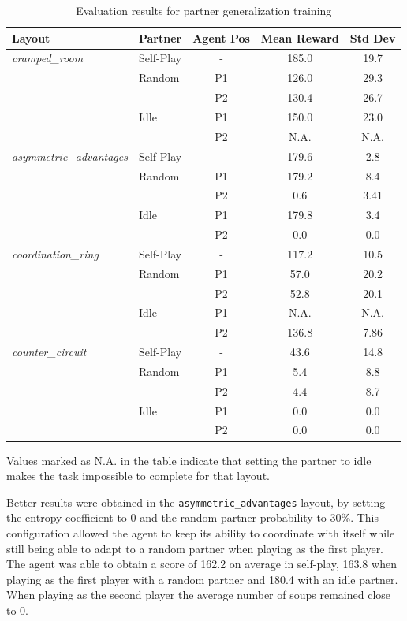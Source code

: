 \documentclass{article}
\begin{document}
\begin{table}[ht]
\centering
\caption{Evaluation results for partner generalization training}
\label{tab:partner_generalization_results}
\begin{tabular}{llccc}
\toprule
Layout & Partner & Agent Pos & Mean Reward & Std Dev \\
\midrule
\textit{cramped\_room} & Self-Play & - & 185.0 & 19.7 \\
 & Random & P1 & 126.0 & 29.3 \\
 & & P2 & 130.4 & 26.7 \\
 & Idle & P1 & 150.0 & 23.0 \\
 & & P2 & N.A. & N.A. \\
\midrule
\textit{asymmetric\_advantages} & Self-Play & - & 179.6 & 2.8 \\
 & Random & P1 & 179.2 & 8.4 \\
 & & P2 & 0.6 & 3.41 \\
 & Idle & P1 & 179.8 & 3.4 \\
 & & P2 & 0.0 & 0.0 \\
\midrule
\textit{coordination\_ring} & Self-Play & - & 117.2 & 10.5 \\
 & Random & P1 & 57.0 & 20.2 \\
 & & P2 & 52.8 & 20.1 \\
 & Idle & P1 & N.A. & N.A. \\
 & & P2 & 136.8 & 7.86 \\
\midrule
\textit{counter\_circuit} & Self-Play & - & 43.6 & 14.8 \\
 & Random & P1 & 5.4 & 8.8 \\
 & & P2 & 4.4 & 8.7 \\
 & Idle & P1 & 0.0 & 0.0 \\
 & & P2 & 0.0 & 0.0 \\

\bottomrule
\end{tabular}
\end{table}

Values marked as N.A. in the table indicate that setting the partner to idle makes the task impossible to complete for that layout.

Better results were obtained in the \texttt{asymmetric\_advantages} layout, by setting the entropy coefficient to 0 and the random partner probability to 30\%. This configuration allowed the agent to keep its ability to coordinate with itself while still being able to adapt to a random partner when playing as the first player. The agent was able to obtain a score of 162.2 on average in self-play, 163.8 when playing as the first player with a random partner and 180.4 with an idle partner. When playing as the second player the average number of soups remained close to 0.
\end{document}
